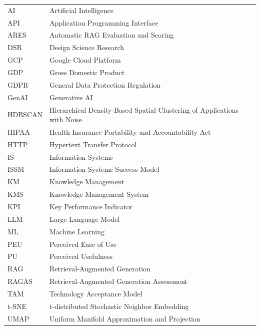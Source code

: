\documentclass[
	english,
	ruledheaders=section,%
	class=report,%
	thesis={type=bachelor},%
	accentcolor=1b,%
	custommargins=true,%
	marginpar=false,%
	parskip=half-,%
	fontsize=11pt,%
	DIV=14,
]{tudapub}
\begin{document}
\begin{xtabular}{ll}
AI & Artificial Intelligence\\
API & Application Programming Interface\\
ARES & Automatic RAG Evaluation and Scoring \\
DSR & Design Science Research\\
GCP & Google Cloud Platform\\
GDP & Gross Domestic Product\\
GDPR & General Data Protection Regulation\\
GenAI & Generative AI\\
HDBSCAN & Hierarchical Density-Based Spatial Clustering of Applications with Noise\\
HIPAA & Health Insurance Portability and Accountability Act\\
HTTP & Hypertext Transfer Protocol\\
IS & Information Systems\\
ISSM & Information Systems Success Model\\
KM & Knowledge Management\\
KMS & Knowledge Management System\\
KPI & Key Performance Indicator\\
LLM & Large Language Model\\
ML & Machine Learning\\
PEU & Perceived Ease of Use\\
PU & Perceived Usefulness\\
RAG & Retrieval-Augmented Generation\\
RAGAS & Retrieval-Augmented Generation Assessment \\
TAM & Technology Acceptance Model\\
t-SNE & t-distributed Stochastic Neighbor Embedding \\
UMAP & Uniform Manifold Approximation and Projection\\
\end{xtabular}
\cleardoublepage 
\onehalfspacing
\setcounter{seitenzahlroemisch}{\value{page}}
\end{document}
